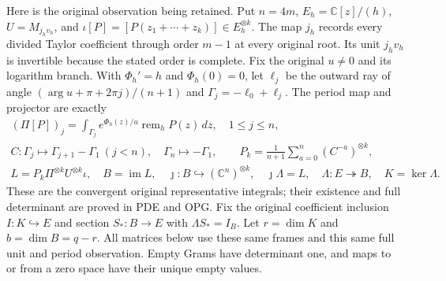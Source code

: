 \documentclass[11pt,a4paper]{article}
\begin{document}
Here is the original observation being retained. Put $n=4m$,
$E_h=\mathbb C[z]/(h)$, $U=M_{j_hv_h}$, and
$\iota[P]=[P(z_1+\cdots+z_k)]\in E_h^{\otimes k}$.
The map $j_h$ records every divided Taylor coefficient through order
$m-1$ at every original root. Its unit $j_hv_h$ is invertible because
the stated order is complete. Fix the original $u\ne0$ and its
logarithm branch. With $\Phi_h'=h$ and $\Phi_h(0)=0$, let
$\ell_j$ be the outward ray of angle
$(\arg u+\pi+2\pi j)/(n+1)$ and $\Gamma_j=-\ell_0+\ell_j$.
The period map and projector are exactly
\[
\begin{gathered}
 (\Pi[P])_j=\int_{\Gamma_j}e^{\Phi_h(z)/u}
                           \operatorname{rem}_hP(z)\,dz,\quad1\le j\le n,\\
 C:\Gamma_j\mapsto\Gamma_{j+1}-\Gamma_1\ (j<n),\quad
        \Gamma_n\mapsto-\Gamma_1,\qquad
 P_k=\frac1{n+1}\sum_{a=0}^{n}(C^{-a})^{\otimes k},\\
 L=P_k\Pi^{\otimes k}U^{\otimes k}\iota,\quad
 B=\operatorname{im}L,\quad\jmath:B\hookrightarrow(\mathbb C^n)^{\otimes k},
 \quad\jmath\Lambda=L,\quad\Lambda:E\twoheadrightarrow B,\quad K=\ker\Lambda.
\end{gathered}\tag{AMT3}
\]
These are the convergent original representative integrals; their
existence and full determinant are proved in PDE and OPG. Fix the
original coefficient inclusion $I:K\hookrightarrow E$ and section
$S_*:B\to E$ with $\Lambda S_*=I_B$. Let
$r=\dim K$ and $b=\dim B=q-r$. All matrices below use these same
frames and this same full unit and period observation. Empty Grams
have determinant one, and maps to or from a zero space have their
unique empty values.
\end{document}
